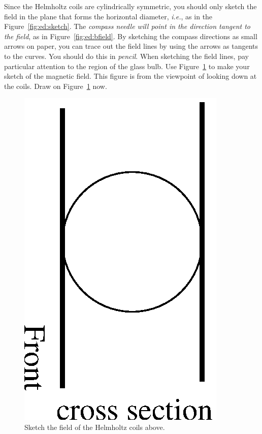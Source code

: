 \noindent Since the Helmholtz coils are cylindrically symmetric, you should
only sketch the field in the plane that forms the horizontal diameter, {\it
i.e.}, as in the Figure~\ref{fig:ed:sketch}. The {\it compass needle will point
in the direction tangent to the field}, as in Figure~\ref{fig:ed:bfield}.
By sketching the compass directions as small arrows on paper, 
you can trace out the field lines by using the arrows as tangents to the
curves. You should do this in {\it pencil}.  When sketching the field lines,
pay particular attention to the region of the glass bulb.  
Use Figure~\ref{fig:ed:worksketch} to make your sketch of the magnetic field. 
This figure is from the viewpoint of looking down at the coils.  Draw
on Figure~\ref{fig:ed:worksketch} now.
\vspace*{2cm} \\

\begin{figure}[!htb]
\centering \epsfysize=6cm \includegraphics[scale=0.6]{3_electrondynamics/csect.eps}
\caption{Sketch the field of the Helmholtz coils above.} 
\label{fig:ed:worksketch}
\end{figure}

